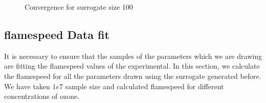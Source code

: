 \begin{figure}[H]
\centering
{}
    \caption{Convergence for surrogate size 100}
\end{figure}


\subsection{flamespeed Data fit}

 It is necessary to ensure that the samples of the parameters which we are drawing are fitting the flamespeed values of the experimental. In this section, we calculate the flamespeed for all the parameters drawn using the surrogate generated before. We have taken $1e7$ sample size and calculated flamespeed for different concentrations of ozone. 

